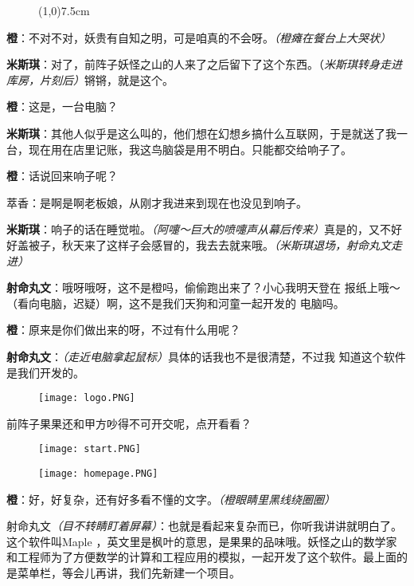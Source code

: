 \begin{figure}[htpb]
    \centering
    \line(1,0){7.5cm}\\

\end{figure}

\textbf{橙}：不对不对，妖贵有自知之明，可是咱真的不会呀。\textit{（橙瘫在餐台上大哭状）}

\textbf{米斯琪}：对了，前阵子妖怪之山的人来了之后留下了这个东西。（\textit{米斯琪转身走进库房，片刻后）}锵锵，就是这个。

\textbf{橙}：这是，一台电脑？

\textbf{米斯琪}：其他人似乎是这么叫的，他们想在幻想乡搞什么互联网，于是就送了我一台，现在用在店里记账，我这鸟脑袋是用不明白。只能都交给响子了。

\textbf{橙}：话说回来响子呢？

萃香：是啊是啊老板娘，从刚才我进来到现在也没见到响子。

\textbf{米斯琪}：响子的话在睡觉啦。\textit{（阿嚏～巨大的喷嚏声从幕后传来）}真是的，又不好好盖被子，秋天来了这样子会感冒的，我去去就来哦。\textit{（米斯琪退场，射命丸文走进）}

\textbf{射命丸文}：哦呀哦呀，这不是橙吗，偷偷跑出来了？小心我明天登在
报纸上哦～（看向电脑，迟疑）啊，这不是我们天狗和河童一起开发的
电脑吗。

\textbf{橙}：原来是你们做出来的呀，不过有什么用呢？

\textbf{射命丸文}：\textit{（走近电脑拿起鼠标）}具体的话我也不是很清楚，不过我
知道这个软件是我们开发的。
\begin{figure}[h]
    \centering
    \texttt{[image: logo.PNG]}
\end{figure}
前阵子果果还和甲方吵得不可开交呢，点开看看？

\begin{figure}[h]
    \centering
    \texttt{[image: start.PNG]}
\end{figure}

\begin{figure}[h]
    \centering
    \texttt{[image: homepage.PNG]}
\end{figure}

\textbf{橙}：好，好复杂，还有好多看不懂的文字。\textit{（橙眼睛里黑线绕圈圈）}

射命丸文\textit{（目不转睛盯着屏幕）}：也就是看起来复杂而已，你听我讲讲就明白了。这个软件叫Maple ，英文里是枫叶的意思，是果果的品味哦。妖怪之山的数学家和工程师为了方便数学的计算和工程应用的模拟，一起开发了这个软件。最上面的是菜单栏，等会儿再讲，我们先新建一个项目。


